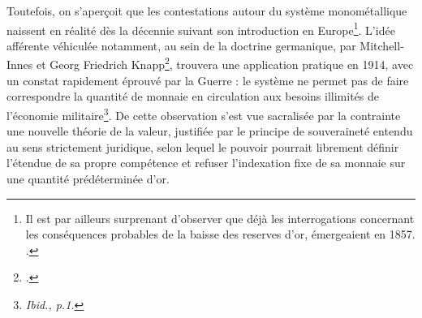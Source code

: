 { Toutefois, on s'aperçoit que les contestations autour du système monométallique naissent en réalité dès la décennie suivant son introduction en Europe\footnote{Il est par ailleurs surprenant d'observer que déjà les interrogations concernant les conséquences probables de la baisse des reserves d'or, émergeaient en 1857. .}. L'idée afférente véhiculée notamment, au sein de la doctrine germanique, par Mitchell-Innes et Georg Friedrich Knapp\footnote{.}, trouvera une application pratique en 1914, avec un constat rapidement éprouvé par la Guerre : le système ne permet pas de faire correspondre la quantité de monnaie en circulation aux besoins illimités de l'économie militaire\footnote{\emph{Ibid., p.1.}}. De cette observation s'est vue sacralisée par la contrainte une nouvelle théorie de la valeur, justifiée par le principe de souveraineté entendu au sens strictement juridique, selon lequel le pouvoir pourrait librement définir l'étendue de sa propre compétence et refuser l'indexation fixe de sa monnaie sur une quantité prédéterminée d'or.\par
}
